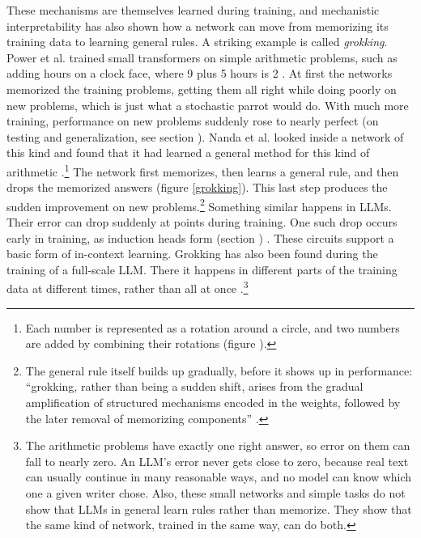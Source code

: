 These mechanisms are themselves learned during training, and mechanistic
interpretability has also shown how a network can move from memorizing its
training data to learning general rules. A striking example is called
\emph{grokking}. Power et al. trained small transformers on simple arithmetic
problems, such as adding hours on a clock face, where 9 plus 5 hours is 2
\cite{power2022grokking}. At first the networks memorized the training
problems, getting them all right while doing poorly on new problems, which is
just what a stochastic parrot would do. With much more training, performance on
new problems suddenly rose to nearly perfect (on testing and generalization,
see section ). Nanda et al. looked inside a network of this
kind and found that it had learned a general method for this kind of
arithmetic \cite{nanda2023progress}.\footnote{Each number is represented as
a rotation around a circle, and two numbers are added by combining their
rotations (figure ).} The network first memorizes,
then learns a general rule, and then drops the memorized answers (figure
\ref{grokking}). This last step produces the sudden improvement on new problems.\footnote{The general
rule itself builds up gradually, before it shows up in performance: ``grokking,
rather than being a sudden shift, arises from the gradual amplification of
structured mechanisms encoded in the weights, followed by the later removal of
memorizing components'' \cite[p.~1]{nanda2023progress}.} Something similar
happens in LLMs. Their error can drop suddenly at points during training. One
such drop occurs early in training, as induction heads form (section
) \cite{olsson2022context}. These circuits support a
basic form of in-context learning. Grokking has also been
found during the training of a full-scale LLM. There it happens in different
parts of the training data at different times, rather than all at
once \cite{li2025grokking}.\footnote{The arithmetic problems have exactly
one right answer, so error on them can fall to nearly zero. An LLM's error
never gets close to zero, because real text can usually continue in many
reasonable ways, and no model can know which one a given writer chose. Also,
these small networks and simple tasks do not show that LLMs in general learn
rules rather than memorize. They show that the same kind of network, trained
in the same way, can do both.}

